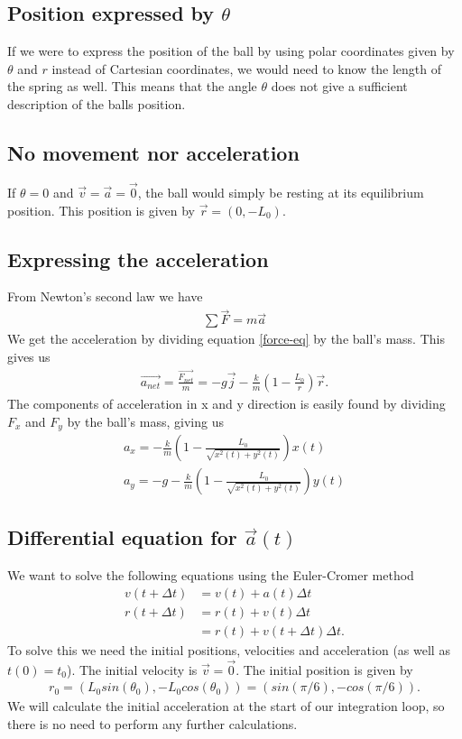 \documentclass[a4paper,10pt,english]{article}
\begin{document}
\subsection{Position expressed by $\theta$}
If we were to express the position of the ball by using polar coordinates given by $\theta$ and $r$ instead of Cartesian coordinates, we would need to know the length of the spring as well. This means that the angle $\theta$ does not give a sufficient description of the balls position. 

\subsection{No movement nor acceleration}
If $\theta = 0$ and $\Vec{v} = \Vec{a} = \Vec{0}$, the ball would simply be resting at its equilibrium position. This position is given by $\Vec{r} = (0, -L_0)$.

\subsection{Expressing the acceleration}
From Newton's second law we have
\begin{align}
    \sum \Vec{F} = m \Vec{a}
\end{align}
We get the acceleration by dividing equation \ref{force-eq} by the ball's mass. This gives us
\begin{align}
    \Vec{a_{net}} 
    = \frac{\Vec{F_{net}}}{m}
    = -g\Vec{j} - \frac{k}{m}\left( 1-\frac{L_0}{r} \right) \Vec{r}.
\end{align}
The components of acceleration in x and y direction is easily found by dividing $F_x$ and $F_y$ by the ball's mass, giving us
\begin{align}
    a_x = - \frac{k}{m} \left( 1 - \frac{L_0}{\sqrt{x^2(t)+y^2(t)}} \right) x(t) \\
    a_y = -g - \frac{k}{m} \left( 1 - \frac{L_0}{\sqrt{x^2(t)+y^2(t)}} \right) y(t)
\end{align}

\subsection{Differential equation for $\Vec{a}(t)$}
We want to solve the following equations using the Euler-Cromer method
\begin{align*}
    v(t + \Delta t) &= v(t) + a(t) \Delta t \\
    r(t + \Delta t) &= r(t) + v(t) \Delta t \\
                    &= r(t) + v(t + \Delta t) \Delta t.
\end{align*}
To solve this we need the initial positions, velocities and acceleration (as well as $t(0) = t_0$). The initial velocity is $\Vec{v} = \Vec{0}$. The initial position is given by 
\begin{align*}
    r_0 = (L_0 sin(\theta_0), -L_0 cos(\theta_0)) = (sin(\pi/6), -cos(\pi/6)).
\end{align*}
We will calculate the initial acceleration at the start of our integration loop, so there is no need to perform any further calculations. 
\end{document}
